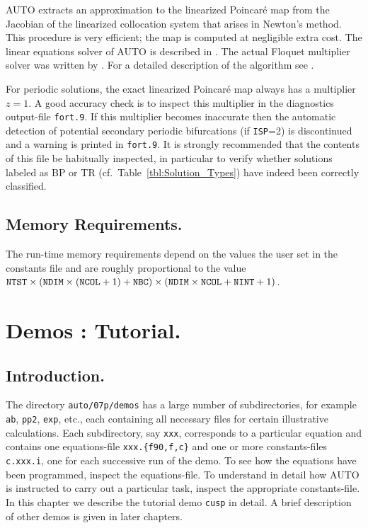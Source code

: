 \documentclass[12pt]{report}
\begin{document}
{\cal AUTO} extracts an approximation to the linearized Poincar\'e map from 
the Jacobian of the linearized collocation system that arises in Newton's method.
This procedure is very efficient; the map is computed at negligible extra cost.
The linear equations solver of {\cal AUTO} is described in 
 \citeyear{DoKeKe:91b}.
The actual Floquet multiplier solver was written by
 \citeyear{Fa:94}.
For a detailed description of the algorithm see 
 \citeyear{FaJe:91}.

For periodic solutions, the exact linearized Poincar\'e map always has 
a multiplier $z=1$.
A good accuracy check is to inspect this 
multiplier in the diagnostics output-file {\tt fort.9}.
If this multiplier becomes inaccurate then the automatic detection 
of potential secondary periodic bifurcations (if {\tt ISP}=2) is discontinued 
and a warning is printed in {\tt fort.9}.
It is strongly recommended that the contents of this file be
habitually inspected,
in particular to verify whether solutions labeled as BP or TR 
(cf.~Table~\ref{tbl:Solution_Types}) have indeed  been correctly classified.
 
\section{ Memory Requirements.} \label{sec:Memory_requirements}
The run-time memory requirements depend on the values the user set in
the constants file and are roughly proportional to the value
${\tt NTST}\times({\tt NDIM}\times({\tt NCOL}+1)+{\tt NBC})\times
({\tt NDIM}\times{\tt NCOL}+{\tt NINT}+1)$.

\chapter{ \AUTO Demos : Tutorial.} \label{ch:Demos:_Tutorial}
\newpage
\section{ Introduction.} \label{sec:Tutorial_Introduction}
The directory {\tt auto/07p/demos} has a large number of subdirectories,
for example {\tt ab}, {\tt pp2}, {\tt exp}, etc.,
each containing all necessary files for certain illustrative calculations.
Each subdirectory, say {\tt xxx}, corresponds to a particular equation
and contains one equations-file {\tt xxx.\{f90,f,c\}}
and one or more constants-files {\tt c.xxx.i}, 
one for each successive run of the demo.
To see how the equations have been programmed, inspect the equations-file. 
To understand in detail how {\cal AUTO} is instructed to carry out a 
particular task, inspect the appropriate constants-file.
In this chapter we describe the tutorial demo {\tt cusp} in detail.
A brief description of other demos is given in later chapters.
\end{document}
